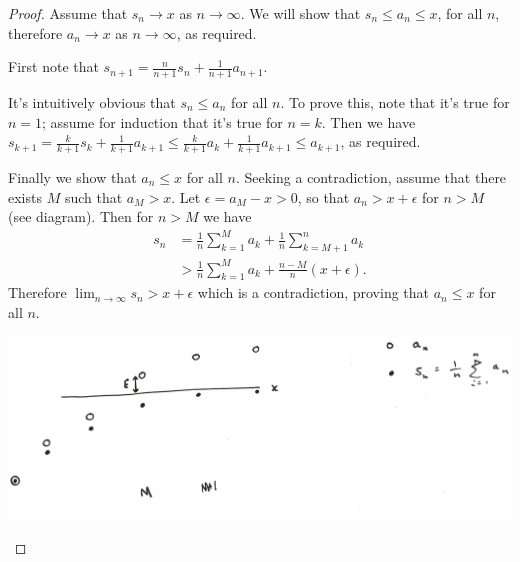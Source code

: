 \documentclass[12pt]{article}
\begin{document}
\begin{proof}
  Assume that $s_n \to x$ as $n \to \infty$. We will show that $s_n \leq a_n \leq x$, for all $n$,
  therefore $a_n \to x$ as $n \to \infty$, as required.

  First note that $s_{n+1} = \frac{n}{n+1}s_n + \frac{1}{n+1}a_{n+1}$.

  It's intuitively obvious that $s_n \leq a_n$ for all $n$. To prove this, note that it's true for
  $n = 1$; assume for induction that it's true for $n = k$. Then we have
  $s_{k+1} = \frac{k}{k+1}s_k + \frac{1}{k+1}a_{k+1} \leq \frac{k}{k+1}a_k + \frac{1}{k+1}a_{k+1}
  \leq a_{k+1}$, as required.

  Finally we show that $a_n \leq x$ for all $n$. Seeking a contradiction, assume that there exists
  $M$ such that $a_M > x$. Let $\epsilon = a_M - x > 0$, so that $a_n > x + \epsilon$ for $n > M$
  (see diagram). Then for $n > M$ we have
  \begin{align*}
    s_n &= \frac{1}{n}\sum_{k=1}^M a_k + \frac{1}{n}\sum_{k=M+1}^n a_k\\
        &> \frac{1}{n}\sum_{k=1}^M a_k + \frac{n - M}{n}(x + \epsilon).
  \end{align*}
  Therefore $\lim_{n\to\infty}s_n > x + \epsilon$ which is a contradiction, proving that
  $a_n \leq x$ for all $n$.
\begin{mdframed}
\includegraphics[width=400pt]{img/misc--cambridge-1a-2017-1-3f-diagram.png}
\end{mdframed}
\end{proof}
\end{document}
